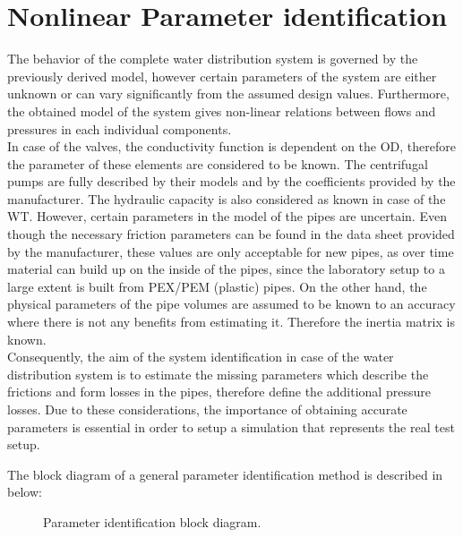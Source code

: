 \section{Nonlinear Parameter identification}
\label{SubSecEstimation}

The behavior of the complete water distribution system is governed by the previously derived model, however certain parameters of the system are either unknown or can vary significantly from the assumed design values. Furthermore, the obtained model of the system gives non-linear relations between flows and pressures in each individual components. 
\\
In case of the valves, the conductivity function is dependent on the OD, therefore the parameter of these elements are considered to be known. The centrifugal pumps are fully described by their models and by the coefficients provided by the manufacturer. The hydraulic capacity is also considered as known in case of the WT. However, certain parameters in the model of the pipes are uncertain. Even though the necessary friction parameters can be found in the data sheet provided by the manufacturer, these values are only acceptable for new pipes, as over time material can build up on the inside of the pipes, since the laboratory setup to a large extent is built from PEX/PEM (plastic) pipes. On the other hand, the physical parameters of the pipe volumes are assumed to be known to an accuracy where there is not any benefits from estimating it. Therefore the inertia matrix is known.  
\\
Consequently, the aim of the system identification in case of the water distribution system is to estimate the missing parameters which describe the frictions and form losses in the pipes, therefore define the additional pressure losses. Due to these considerations, the importance of obtaining accurate parameters is essential in order to setup a simulation that represents the real test setup. 


The block diagram of a general parameter identification method is described in  below: 

\begin{figure}[H]
\centering
 
\caption{Parameter identification block diagram. }
\label{fig:parame_block}
\end{figure}

